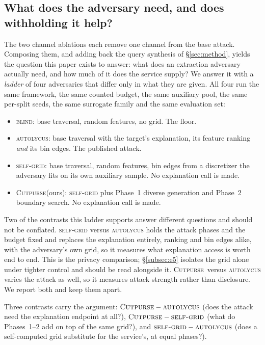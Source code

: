 \documentclass[sigconf,anonymous,review]{acmart}
\newcommand{\sys}{\textsc{Cutpurse}}
\begin{document}
\subsection{What does the adversary need, and does withholding it help?}
\label{subsec:ladder}
The two channel ablations each remove one channel from the base attack. Composing them, and adding back the query
synthesis of \S\ref{sec:method}, yields the question this paper exists to answer: what does an
extraction adversary actually need, and how much of it does the service supply? We answer it with a
\emph{ladder} of four adversaries that differ only in what they are given. All four run the same
framework, the same counted budget, the same auxiliary pool, the same per-split seeds, the same
surrogate family and the same evaluation set:

\begin{itemize}
  \item \textsc{blind}: base traversal, random features, no grid. The floor.
  \item \textsc{autolycus}: base traversal with the target's explanation, its feature ranking \emph{and} its bin edges. The published attack.
  \item \textsc{self-grid}: base traversal, random features, bin edges from a discretizer the
  adversary fits on its own auxiliary sample. No explanation call is made.
  \item \sys (ours): \textsc{self-grid} plus Phase~1 diverse generation and
  Phase~2 boundary search. No explanation call is made.
\end{itemize}

Two of the contrasts this ladder supports answer different questions and should not be conflated.
\textsc{self-grid} versus \textsc{autolycus} holds the attack phases and the budget fixed and
replaces the explanation entirely, ranking and bin edges alike, with the adversary's own grid, so it
measures what explanation access is worth end to end. This is the privacy comparison;
\S\ref{subsec:e5} isolates the grid alone under tighter control and should be read alongside it. \sys\
versus \textsc{autolycus} varies the attack as well, so it measures attack strength rather than
disclosure. We report both and keep them apart.

Three contrasts carry the argument:
$\sys-\textsc{autolycus}$ (does the attack need the explanation endpoint at all?),
$\sys-\textsc{self-grid}$ (what do Phases~1--2 add on top of the same grid?), and
$\textsc{self-grid}-\textsc{autolycus}$ (does a self-computed grid substitute for the service's, at
equal phases?).
\end{document}

